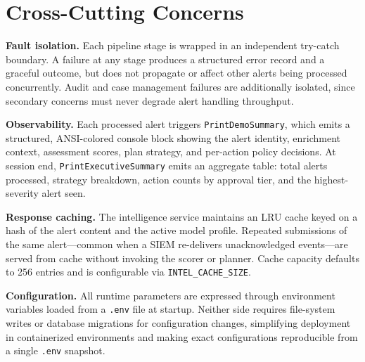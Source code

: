 \section{Cross-Cutting Concerns}

\textbf{Fault isolation.} Each pipeline stage is wrapped in an independent try-catch
boundary. A failure at any stage produces a structured error record and a graceful
outcome, but does not propagate or affect other alerts being processed concurrently.
Audit and case management failures are additionally isolated, since secondary concerns
must never degrade alert handling throughput.

\textbf{Observability.} Each processed alert triggers \texttt{PrintDemoSummary}, which
emits a structured, ANSI-colored console block showing the alert identity, enrichment
context, assessment scores, plan strategy, and per-action policy decisions.
At session end, \texttt{PrintExecutiveSummary} emits an aggregate table: total alerts
processed, strategy breakdown, action counts by approval tier, and the highest-severity
alert seen.

\textbf{Response caching.} The intelligence service maintains an LRU cache keyed on
a hash of the alert content and the active model profile. Repeated submissions of the
same alert---common when a SIEM re-delivers unacknowledged events---are served from
cache without invoking the scorer or planner. Cache capacity defaults to 256 entries
and is configurable via \texttt{INTEL\_CACHE\_SIZE}.

\textbf{Configuration.} All runtime parameters are expressed through environment
variables loaded from a \texttt{.env} file at startup. Neither side requires file-system
writes or database migrations for configuration changes, simplifying deployment in
containerized environments and making exact configurations reproducible from a single
\texttt{.env} snapshot.
